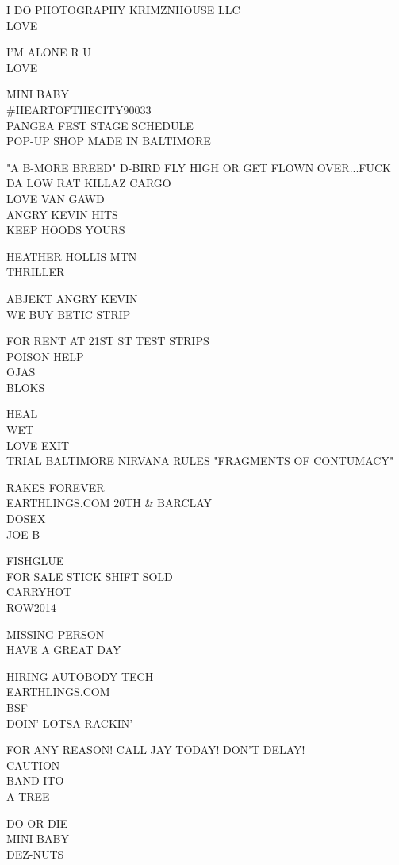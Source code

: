 \documentclass[10pt,letterpaper]{article}
\begin{document}
I DO PHOTOGRAPHY KRIMZNHOUSE LLC\\
LOVE

I'M ALONE R U\\
LOVE

MINI BABY\\
\#HEARTOFTHECITY90033\\
PANGEA FEST STAGE SCHEDULE\\
POP{-}UP SHOP MADE IN BALTIMORE

"A B{-}MORE BREED" D{-}BIRD FLY HIGH OR GET FLOWN OVER...FUCK DA LOW RAT KILLAZ CARGO\\
LOVE VAN GAWD\\
ANGRY KEVIN HITS\\
KEEP HOODS YOURS

HEATHER HOLLIS MTN\\
THRILLER

ABJEKT ANGRY KEVIN\\
WE BUY BETIC STRIP

FOR RENT AT 21ST ST TEST STRIPS\\
POISON HELP\\
OJAS\\
BLOKS

HEAL\\
WET\\
LOVE EXIT\\
TRIAL BALTIMORE NIRVANA RULES "FRAGMENTS OF CONTUMACY"

RAKES FOREVER\\
EARTHLINGS.COM 20TH \& BARCLAY\\
DOSEX\\
JOE B

FISHGLUE\\
FOR SALE STICK SHIFT SOLD\\
CARRYHOT\\
ROW2014

MISSING PERSON\\
HAVE A GREAT DAY

HIRING AUTOBODY TECH\\
EARTHLINGS.COM\\
BSF\\
DOIN' LOTSA RACKIN'

FOR ANY REASON!  CALL JAY TODAY!  DON'T DELAY!\\
CAUTION\\
BAND{-}ITO\\
A TREE

DO OR DIE\\
MINI BABY\\
DEZ{-}NUTS
\end{document}
